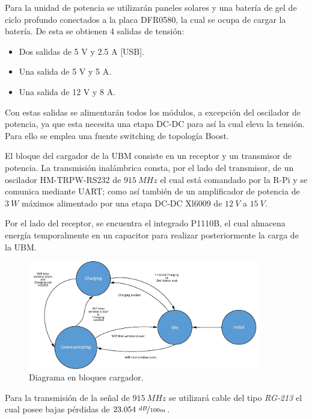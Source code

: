 
Para la unidad de potencia se utilizarán paneles solares y una batería de gel de ciclo profundo conectados a la placa DFR0580, la cual se ocupa de cargar la batería. De esta se obtienen 4 salidas de tensión:
\begin{itemize}
	\item Dos salidas de 5 V y 2.5 A [USB].
	\item Una salida de 5 V y 5 A.
	\item Una salida de 12 V y 8 A.
\end{itemize}

Con estas salidas se alimentarán todos los módulos, a excepción del oscilador de potencia, ya que esta necesita una etapa DC-DC para así la cual eleva la tensión. Para ello se emplea una fuente switching de topología Boost.


El bloque del cargador de la UBM consiste en un receptor y un transmisor de potencia. La transmisión inalámbrica consta, por el lado del transmisor, de un oscilador HM-TRPW-RS232 de $915 \ MHz$ el cual está comandado por la R-Pi y se comunica mediante UART; como así también de un amplificador de potencia de $3 \ W$ máximos alimentado por una etapa DC-DC Xl6009 de $12 \ V$ a $15 \ V$.

Por el lado del receptor, se encuentra el integrado P1110B, el cual almacena energía temporalmente en un capacitor para realizar posteriormente la carga de la UBM.

\begin{figure}[H]
	\centering	
	\includegraphics[width=0.9\textwidth, page=8]{ImagenesIngenieria de Detalle/FlowChart.pdf}
	\caption{Diagrama en bloques cargador.}
	\label{fig:diagrama_hardware_antenas}
\end{figure}

Para la transmisión de la señal de $915 \ MHz$ se utilizará cable del tipo \textit{RG-213} el cual posee bajas pérdidas de $23.054 \ \nicefrac{dB}{100m}$.\\

